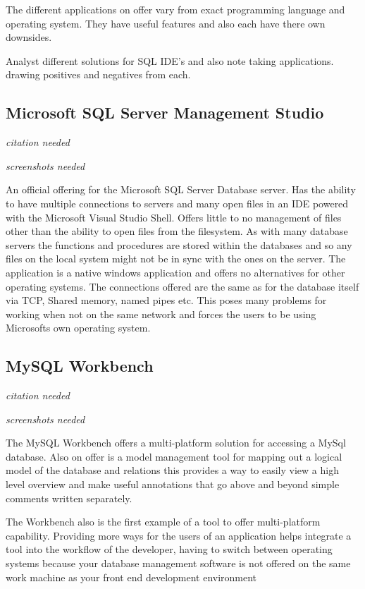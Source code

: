 The different applications on offer vary from exact programming language
and operating system. They have useful features and also each have there
own downsides.

Analyst different solutions for SQL IDE's and also note taking
applications. drawing positives and negatives from each.

\subsection{Microsoft SQL Server Management
Studio}\label{microsoft-sql-server-management-studio}

\emph{citation needed}

\emph{screenshots needed}

An official offering for the Microsoft SQL Server Database server. Has
the ability to have multiple connections to servers and many open files
in an IDE powered with the Microsoft Visual Studio Shell. Offers little
to no management of files other than the ability to open files from the
filesystem. As with many database servers the functions and procedures
are stored within the databases and so any files on the local system
might not be in sync with the ones on the server. The application is a
native windows application and offers no alternatives for other
operating systems. The connections offered are the same as for the
database itself via TCP, Shared memory, named pipes etc. This poses many
problems for working when not on the same network and forces the users
to be using Microsofts own operating system.

\subsection{MySQL Workbench}\label{mysql-workbench}

\emph{citation needed}

\emph{screenshots needed}

The MySQL Workbench offers a multi-platform solution for accessing a
MySql database. Also on offer is a model management tool for mapping out
a logical model of the database and relations this provides a way to
easily view a high level overview and make useful annotations that go
above and beyond simple comments written separately.

The Workbench also is the first example of a tool to offer
multi-platform capability. Providing more ways for the users of an
application helps integrate a tool into the workflow of the developer,
having to switch between operating systems because your database
management software is not offered on the same work machine as your
front end development environment

